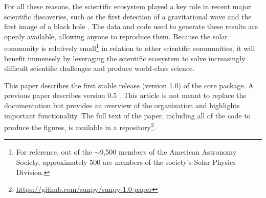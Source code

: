 For all these reasons, the scientific \python ecosystem played a key role in recent major scientific discoveries, such as the first detection of a gravitational wave \citep{ligo_scientific_collaboration_and_virgo_collaboration_observation_2016} and the first image of a black hole \citep{collaboration_first_2019}.
The data and code used to generate these results are openly available, allowing anyone to reproduce them.
Because the solar community is relatively small\footnote{For reference, out of the $\sim$9,500 members of the American Astronomy Society, approximately 500 are members of the society's Solar Physics Division.} in relation to other scientific communities, it will benefit immensely by leveraging the \python scientific ecosystem to solve increasingly difficult scientific challenges and produce world-class science.

This paper describes the first stable release (version 1.0) of the \sunpypkg core package.
A previous paper describes version 0.5 \citep{Community:2015cy}.
This article is not meant to replace the \sunpypkg documentation but provides an overview of the organization and highlights important functionality.
The full text of the paper, including all of the code to produce the figures, is available in a \github repository\footnote{\url{https://github.com/sunpy/sunpy-1.0-paper}}.
